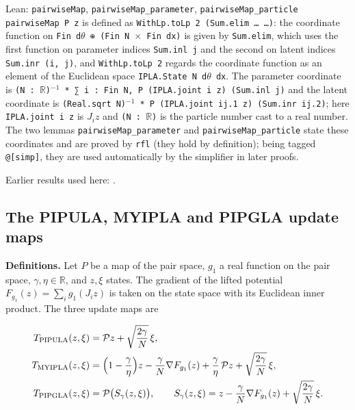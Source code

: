 \documentclass[11pt,a4paper]{report}
\begin{document}
\begin{leanbox}{Lean: \texttt{pairwiseMap}, \texttt{pairwiseMap\_\allowbreak{}parameter}, \texttt{pairwiseMap\_\allowbreak{}particle}}
\texttt{pairwise\allowbreak{}Map P z} is defined as \texttt{With\allowbreak{}Lp.\allowbreak{}to\allowbreak{}Lp 2 (Sum.\allowbreak{}elim … …)}: the coordinate function on \texttt{Fin d\ensuremath{\theta} ⊕ (Fin N \ensuremath{\times} Fin dx)} is given by \texttt{Sum.\allowbreak{}elim}, which uses the first function on parameter indices \texttt{Sum.\allowbreak{}inl j} and the second on latent indices \texttt{Sum.\allowbreak{}inr (i, j)}, and \texttt{With\allowbreak{}Lp.\allowbreak{}to\allowbreak{}Lp 2} regards the coordinate function as an element of the Euclidean space \texttt{IPLA.\allowbreak{}State N d\ensuremath{\theta} dx}. The parameter coordinate is \texttt{(N : \ensuremath{\mathbb R})\ensuremath{{}^{-1}} * ∑ i : Fin N, P (IPLA.\allowbreak{}joint i z) (Sum.\allowbreak{}inl j)} and the latent coordinate is \texttt{(Real.\allowbreak{}sqrt N)\ensuremath{{}^{-1}} * P (IPLA.\allowbreak{}joint ij.\allowbreak{}1 z) (Sum.\allowbreak{}inr ij.\allowbreak{}2)}; here \texttt{IPLA.\allowbreak{}joint i z} is \(J_iz\) and \texttt{(N : \ensuremath{\mathbb R})} is the particle number cast to a real number. The two lemmas \texttt{pairwise\allowbreak{}Map\_\allowbreak{}parameter} and \texttt{pairwise\allowbreak{}Map\_\allowbreak{}particle} state these coordinates and are proved by \texttt{rfl} (they hold by definition); being tagged \texttt{@[simp]}, they are used automatically by the simplifier in later proofs.
\end{leanbox}


Earlier results used here: \cite[Section~3.1.1]{LangevinLean2026IPLA}.
\subsection{\texorpdfstring{The PIPULA, MYIPLA and PIPGLA update maps}{The PIPULA, MYIPLA and PIPGLA update maps}}
\label{report-step-ProximalLangevin-Algorithms-lean-2}


\textbf{Definitions.} Let \(P\) be a map of the pair space, \(g_1\) a real function on the pair space, \(\gamma,\eta\in\mathbb R\), and \(z,\xi\) states. The gradient of the lifted potential \(F_{g_1}(z)=\sum_ig_1(J_iz)\) is taken on the state space with its Euclidean inner product. The three update maps are


\[\begin{aligned}
T_{\mathrm{PIPULA}}(z,\xi)&=\mathcal Pz+\sqrt{\frac{2\gamma}{N}}\,\xi,\\
T_{\mathrm{MYIPLA}}(z,\xi)&=\Bigl(1-\frac\gamma\eta\Bigr)z-\frac\gamma N\nabla F_{g_1}(z)+\frac\gamma\eta\,\mathcal Pz+\sqrt{\frac{2\gamma}{N}}\,\xi,\\
T_{\mathrm{PIPGLA}}(z,\xi)&=\mathcal P\bigl(S_\gamma(z,\xi)\bigr),\qquad S_\gamma(z,\xi)=z-\frac\gamma N\nabla F_{g_1}(z)+\sqrt{\frac{2\gamma}{N}}\,\xi .
\end{aligned}\]
\end{document}
